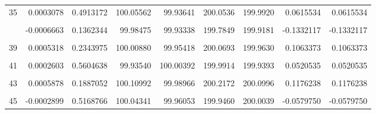 \documentclass[a4paper]{tufte-handout}
\begin{document}
\begin{table}
{\begin{tabular}[t]{rrrrrrrrr}
35 & 0.0003078 & 0.4913172 & 100.05562 & 99.93641 & 200.0536 & 199.9920 & 0.0615534 & 0.0615534\\
\cellcolor{gray!6}{36} & \cellcolor{gray!6}{0.0000576} & \cellcolor{gray!6}{0.8974954} & \cellcolor{gray!6}{99.94412} & \cellcolor{gray!6}{99.96231} & \cellcolor{gray!6}{199.9180} & \cellcolor{gray!6}{199.9064} & \cellcolor{gray!6}{0.0115172} & \cellcolor{gray!6}{0.0115172}\\
\addlinespace
37 & -0.0006663 & 0.1362344 & 99.98475 & 99.93338 & 199.7849 & 199.9181 & -0.1332117 & -0.1332117\\
\cellcolor{gray!6}{38} & \cellcolor{gray!6}{-0.0000595} & \cellcolor{gray!6}{0.8942027} & \cellcolor{gray!6}{100.13083} & \cellcolor{gray!6}{100.05302} & \cellcolor{gray!6}{200.1719} & \cellcolor{gray!6}{200.1838} & \cellcolor{gray!6}{-0.0119058} & \cellcolor{gray!6}{-0.0119058}\\
39 & 0.0005318 & 0.2343975 & 100.00880 & 99.95418 & 200.0693 & 199.9630 & 0.1063373 & 0.1063373\\
\cellcolor{gray!6}{40} & \cellcolor{gray!6}{-0.0001554} & \cellcolor{gray!6}{0.7281648} & \cellcolor{gray!6}{100.10111} & \cellcolor{gray!6}{99.86696} & \cellcolor{gray!6}{199.9370} & \cellcolor{gray!6}{199.9681} & \cellcolor{gray!6}{-0.0310824} & \cellcolor{gray!6}{-0.0310824}\\
41 & 0.0002603 & 0.5604638 & 99.93540 & 100.00392 & 199.9914 & 199.9393 & 0.0520535 & 0.0520535\\
\addlinespace
\cellcolor{gray!6}{42} & \cellcolor{gray!6}{0.0002006} & \cellcolor{gray!6}{0.6537639} & \cellcolor{gray!6}{100.09478} & \cellcolor{gray!6}{99.95661} & \cellcolor{gray!6}{200.0915} & \cellcolor{gray!6}{200.0514} & \cellcolor{gray!6}{0.0401289} & \cellcolor{gray!6}{0.0401289}\\
43 & 0.0005878 & 0.1887052 & 100.10992 & 99.98966 & 200.2172 & 200.0996 & 0.1176238 & 0.1176238\\
\cellcolor{gray!6}{44} & \cellcolor{gray!6}{0.0000720} & \cellcolor{gray!6}{0.8720832} & \cellcolor{gray!6}{100.00396} & \cellcolor{gray!6}{99.89731} & \cellcolor{gray!6}{199.9157} & \cellcolor{gray!6}{199.9013} & \cellcolor{gray!6}{0.0143943} & \cellcolor{gray!6}{0.0143943}\\
45 & -0.0002899 & 0.5168766 & 100.04341 & 99.96053 & 199.9460 & 200.0039 & -0.0579750 & -0.0579750\\
\bottomrule
\end{tabular}}
\end{table}
\end{document}
